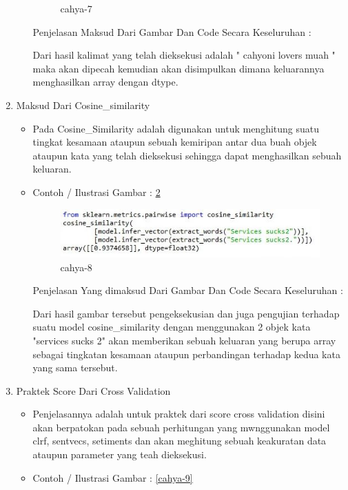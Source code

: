 \begin{enumerate}
\begin{itemize}
\begin{figure}[!hbtp]
\caption{cahya-7}
\label{cahya-7}
\end{figure}
\par
\par Penjelasan  Maksud Dari Gambar Dan Code Secara Keseluruhan  : 
\par Dari hasil kalimat yang telah dieksekusi adalah "  cahyoni lovers muah " maka akan dipecah kemudian akan disimpulkan dimana keluarannya menghasilkan array dengan dtype.
\par
\end{itemize}
\item Maksud Dari Cosine\_similarity
\begin{itemize}
\item Pada Cosine\_Similarity adalah digunakan untuk menghitung suatu tingkat kesamaan ataupun sebuah  kemiripan antar dua buah objek ataupun kata yang telah dieksekusi sehingga dapat menghasilkan sebuah keluaran.
\item Contoh / Ilustrasi Gambar : \ref{cahya-8}
\par
\begin{figure}[!hbtp]
\centering
\includegraphics[scale=0.3]{figures/cahya-8.jpg}
\caption{cahya-8}
\label{cahya-8}
\end{figure}
\par
\par Penjelasan  Yang dimaksud Dari Gambar Dan Code Secara Keseluruhan : 
\par Dari hasil gambar tersebut pengeksekusian dan juga pengujian terhadap suatu model cosine\_similarity dengan menggunakan 2 objek kata "services sucks 2" akan memberikan sebuah keluaran yang berupa array sebagai tingkatan kesamaan ataupun perbandingan terhadap kedua kata yang sama tersebut.
\par
\end{itemize}
\item Praktek Score Dari Cross Validation
\begin{itemize}
\item Penjelasannya adalah  untuk praktek dari score cross validation disini akan berpatokan pada sebuah perhitungan yang mwnggunakan model clrf, sentvecs, setiments dan  akan meghitung sebuah keakuratan data ataupun parameter yang teah dieksekusi.
\item Contoh / Ilustrasi Gambar : \ref{cahya-9}

\end{itemize}
\end{enumerate}
